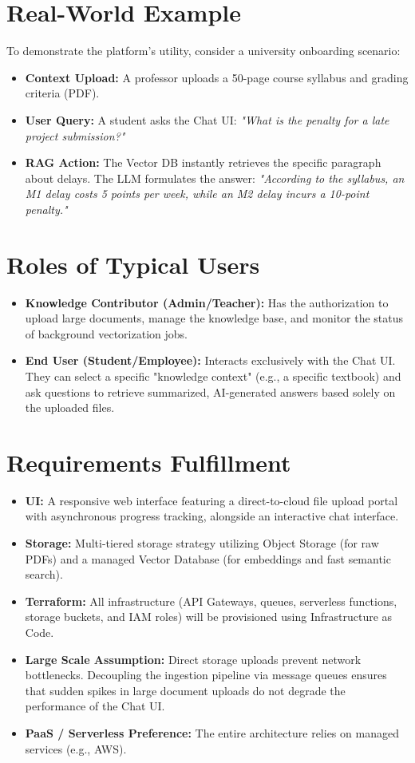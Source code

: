 \documentclass[12pt,a4paper]{article}
\begin{document}
\section{Real-World Example}
To demonstrate the platform's utility, consider a university onboarding scenario:
\begin{itemize}[label=\textbullet]
    \item \textbf{Context Upload:} A professor uploads a 50-page course syllabus and grading criteria (PDF).
    \item \textbf{User Query:} A student asks the Chat UI: \textit{"What is the penalty for a late project submission?"}
    \item \textbf{RAG Action:} The Vector DB instantly retrieves the specific paragraph about delays. The LLM formulates the answer: \textit{"According to the syllabus, an M1 delay costs 5 points per week, while an M2 delay incurs a 10-point penalty."}
\end{itemize}

\section{Roles of Typical Users}
\begin{itemize}[label=\textbullet]
    \item \textbf{Knowledge Contributor (Admin/Teacher):} Has the authorization to upload large documents, manage the knowledge base, and monitor the status of background vectorization jobs.
    \item \textbf{End User (Student/Employee):} Interacts exclusively with the Chat UI. They can select a specific "knowledge context" (e.g., a specific textbook) and ask questions to retrieve summarized, AI-generated answers based solely on the uploaded files.
\end{itemize}

\section{Requirements Fulfillment}
\begin{itemize}[label=\textbullet]
    \item \textbf{UI:} A responsive web interface featuring a direct-to-cloud file upload portal with asynchronous progress tracking, alongside an interactive chat interface.
    \item \textbf{Storage:} Multi-tiered storage strategy utilizing Object Storage (for raw PDFs) and a managed Vector Database (for embeddings and fast semantic search).
    \item \textbf{Terraform:} All infrastructure (API Gateways, queues, serverless functions, storage buckets, and IAM roles) will be provisioned using Infrastructure as Code.
    \item \textbf{Large Scale Assumption:} Direct storage uploads prevent network bottlenecks. Decoupling the ingestion pipeline via message queues ensures that sudden spikes in large document uploads do not degrade the performance of the Chat UI.
    \item \textbf{PaaS / Serverless Preference:} The entire architecture relies on managed services (e.g., AWS).
\end{itemize}
\end{document}
